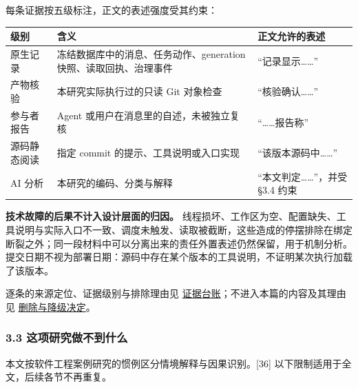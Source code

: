 \documentclass[
]{article}
\newcounter{none} %
\begin{document}
每条证据按五级标注，正文的表述强度受其约束：

{\def\LTcaptype{none} %
\begin{longtable}[]{@{}
  >{\raggedright\arraybackslash}p{}
  >{\raggedright\arraybackslash}p{}
  >{\raggedright\arraybackslash}p{}@{}}
\toprule\noalign{}
\begin{minipage}[b]{\linewidth}\raggedright
级别
\end{minipage} & \begin{minipage}[b]{\linewidth}\raggedright
含义
\end{minipage} & \begin{minipage}[b]{\linewidth}\raggedright
正文允许的表述
\end{minipage} \\
\midrule\noalign{}
\endhead
\bottomrule\noalign{}
\endlastfoot
原生记录 & 冻结数据库中的消息、任务动作、generation
快照、读取回执、治理事件 & ``记录显示\ldots\ldots{}'' \\
产物核验 & 本研究实际执行过的只读 Git 对象检查 &
``核验确认\ldots\ldots{}'' \\
参与者报告 & Agent 或用户在消息里的自述，未被独立复核 &
``\ldots\ldots 报告称'' \\
源码静态阅读 & 指定 commit 的提示、工具说明或入口实现 &
``该版本源码中\ldots\ldots{}'' \\
AI 分析 & 本研究的编码、分类与解释 & ``本文判定\ldots\ldots{}''，并受
§3.4 约束 \\
\end{longtable}
}

\textbf{技术故障的后果不计入设计层面的归因。}
线程损坏、工作区为空、配置缺失、工具说明与实际入口不一致、调度未触发、读取被截断，这些造成的停摆排除在绑定断裂之外；同一段材料中可以分离出来的责任外置表述仍然保留，用于机制分析。提交日期不视为部署日期：源码中存在某个版本的工具说明，不证明某次执行加载了该版本。

逐条的来源定位、证据级别与排除理由见
\href{evidence-ledger.md}{证据台账}；不进入本篇的内容及其理由见
\href{exclusions.md}{删除与降级决定}。

\subsubsection{3.3
这项研究做不到什么}\label{ux8fd9ux9879ux7814ux7a76ux505aux4e0dux5230ux4ec0ux4e48}

本文按软件工程案例研究的惯例区分情境解释与因果识别。{[}36{]}
以下限制适用于全文，后续各节不再重复。
\end{document}
